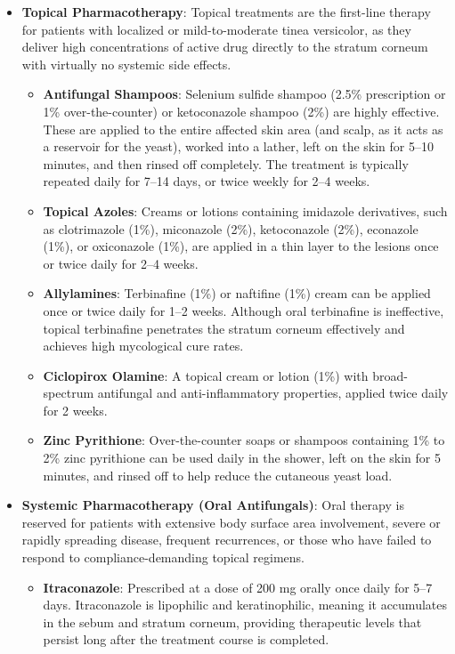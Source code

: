 \begin{itemize}
    \item \textbf{Topical Pharmacotherapy}: Topical treatments are the first-line therapy for patients with localized or mild-to-moderate tinea versicolor, as they deliver high concentrations of active drug directly to the stratum corneum with virtually no systemic side effects.
    \begin{itemize}
        \item \textbf{Antifungal Shampoos}: Selenium sulfide shampoo (2.5\% prescription or 1\% over-the-counter) or ketoconazole shampoo (2\%) are highly effective. These are applied to the entire affected skin area (and scalp, as it acts as a reservoir for the yeast), worked into a lather, left on the skin for 5--10 minutes, and then rinsed off completely. The treatment is typically repeated daily for 7--14 days, or twice weekly for 2--4 weeks.
        \item \textbf{Topical Azoles}: Creams or lotions containing imidazole derivatives, such as clotrimazole (1\%), miconazole (2\%), ketoconazole (2\%), econazole (1\%), or oxiconazole (1\%), are applied in a thin layer to the lesions once or twice daily for 2--4 weeks.
        \item \textbf{Allylamines}: Terbinafine (1\%) or naftifine (1\%) cream can be applied once or twice daily for 1--2 weeks. Although oral terbinafine is ineffective, topical terbinafine penetrates the stratum corneum effectively and achieves high mycological cure rates.
        \item \textbf{Ciclopirox Olamine}: A topical cream or lotion (1\%) with broad-spectrum antifungal and anti-inflammatory properties, applied twice daily for 2 weeks.
        \item \textbf{Zinc Pyrithione}: Over-the-counter soaps or shampoos containing 1\% to 2\% zinc pyrithione can be used daily in the shower, left on the skin for 5 minutes, and rinsed off to help reduce the cutaneous yeast load.
    \end{itemize}
    \item \textbf{Systemic Pharmacotherapy (Oral Antifungals)}: Oral therapy is reserved for patients with extensive body surface area involvement, severe or rapidly spreading disease, frequent recurrences, or those who have failed to respond to compliance-demanding topical regimens.
    \begin{itemize}
        \item \textbf{Itraconazole}: Prescribed at a dose of 200 mg orally once daily for 5--7 days. Itraconazole is lipophilic and keratinophilic, meaning it accumulates in the sebum and stratum corneum, providing therapeutic levels that persist long after the treatment course is completed.

\end{itemize}
\end{itemize}
